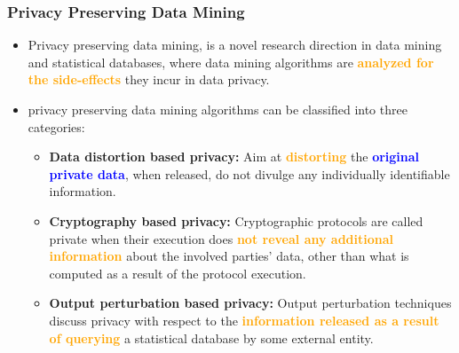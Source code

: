 \documentclass{beamer} %
\newcommand{\blue}[1]{\textcolor{blue}{#1}}
\newcommand{\orange}[1]{\textcolor{orange}{#1}}
\begin{document}
\begin{frame}
\frametitle{Privacy Preserving Data Mining}
\begin{itemize} \itemsep2pt \parskip0pt 
    \item Privacy preserving data mining, is a novel research  direction  in  data  mining  and  statistical databases, where data mining algorithms are \orange{\bf analyzed for the side-effects} they incur in data privacy.

    \item privacy preserving data mining algorithms can be classified into three categories:
    \begin{itemize} \itemsep2pt \parskip0pt 
        \item {\bf Data distortion based privacy:} Aim at \orange{\bf distorting} the \blue{\bf original private data}, when released, do not divulge any individually identifiable information.
        \item {\bf Cryptography based privacy:} Cryptographic protocols are called private when their execution does \orange{\bf not reveal any additional information} about the involved parties' data, other than what is computed as a result of the protocol execution.
        \item {\bf Output perturbation based privacy:} Output perturbation techniques discuss privacy with respect to the \orange{\bf information released as a result of querying} a statistical database by some external entity.
    \end{itemize}
\end{itemize}



\end{frame}
\end{document}
